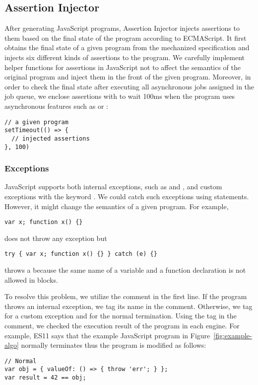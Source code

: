 \subsection{Assertion Injector}

After generating JavaScript programs, \textsf{Assertion Injector} injects
assertions to them based on the final state of the program according to
ECMAScript.  It first obtains the final state of a given program from the
mechanized specification and injects six different kinds of assertions to the
program.  We carefully implement helper functions for assertions in JavaScript
not to affect the semantics of the original program and inject them in the front
of the given program.  Moreover, in order to check the final state after
executing all asynchronous jobs assigned in the job queue, we enclose assertions
with  to wait 100ms when the program uses asynchronous features
such as  or :
\begin{lstlisting}[style=myJSstyle]
// a given program
setTimeout(() => {
  // injected assertions
}, 100)
\end{lstlisting}


\subsubsection{Exceptions}

JavaScript supports both internal exceptions, such as  and
, and custom exceptions with the keyword .  We could
catch such exceptions using  statements.  However, it might
change the semantics of a given program.  For example,
\begin{lstlisting}[style=myJSstyle]
var x; function x() {}
\end{lstlisting}
does not throw any exception but
\begin{lstlisting}[style=myJSstyle]
try { var x; function x() {} } catch (e) {}
\end{lstlisting}
throws a  because the same name of a variable and a function
declaration is not allowed in  blocks.

To resolve this problem, we utilize the comment in the first line.  If the
program throws an internal exception, we tag its name in the comment.
Otherwise, we tag  for a custom exception and  for
the normal termination.  Using the tag in the comment, we checked the execution
result of the program in each engine.  For example, ES11 says that the example
JavaScript program in Figure~\ref{fig:example-algo} normally terminates thus the
program is modified as follows:
\begin{lstlisting}[style=myJSstyle]
// Normal
var obj = { valueOf: () => { throw 'err'; } };
var result = 42 == obj;
\end{lstlisting}


